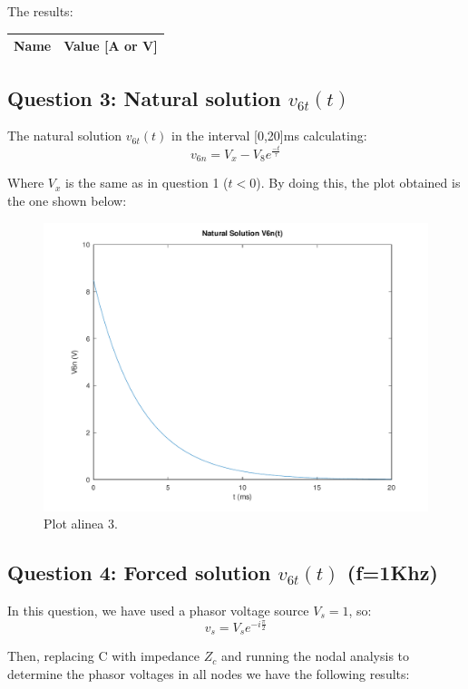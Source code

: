 The results:

\begin{center}
  \begin{tabular}{ | c | c | }
    \hline    
    {\bf Name} & {\bf Value [A or V]} \\ \hline
    
    \hline
  \end{tabular}
\end{center}


\subsection{Question 3: Natural solution $v_{6t}(t)$}
The natural solution $v_{6t}(t)$ in the interval [0,20]ms calculating:
\begin{equation}
     v_{6n} = {V_x-V_8}e^{\frac{-t}{\tau}}
\end{equation}\par
Where $V_x$ is the same as in question 1 ($t<0$).
By doing this, the plot obtained is the one shown below:

\begin{figure}[H] \centering
\includegraphics[width=0.7\linewidth]{../mat/alinea3.pdf}
\caption{Plot alinea 3.}
\label{fig:plot3}
\end{figure}


\subsection{Question 4: Forced solution $v_{6t}(t)$ (f=1Khz)}
In this question, we have used a phasor voltage source $V_s = 1$, so:
\begin{equation}
     v_s = {V_s}e^{-i\frac{\pi}{2}}
\end{equation}\par
Then, replacing C with  impedance $Z_c$ and running the nodal analysis to determine the phasor voltages in all nodes we have the following results:\par

